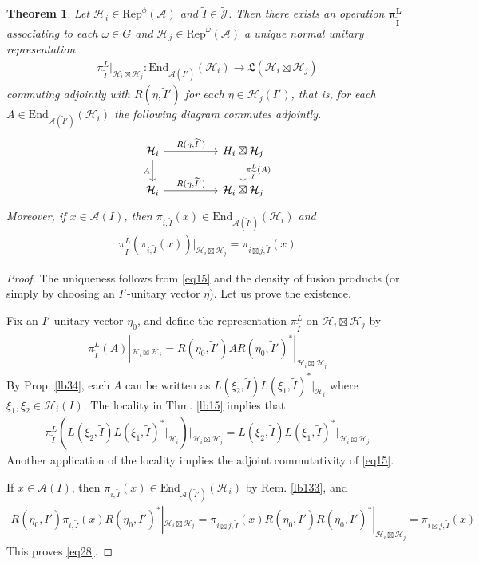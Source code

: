 \documentclass[11pt,b5paper,notitlepage]{article}
\theoremstyle{definition}
\theoremstyle{plain}
\newtheorem{thm}[df]{Theorem}
\newcommand{\fk}{\mathfrak}
\newcommand{\mc}{\mathcal}
\newcommand{\wtd}{\widetilde}
\newcommand{\End}{\mathrm{End}} %
\newcommand{\Rep}{\mathrm{Rep}}
\newcommand{\Jtd}{\widetilde{\mathcal J}}
\newcommand{\MA}{\mathcal A}
\newcommand{\MH}{\mathcal H}
\numberwithin{equation}{section}
\begin{document}
\begin{thm}\label{lb35}
Let $\MH_i\in\Rep^\phi(\MA)$ and $\wtd I\in\Jtd$. Then there exists an operation $\pmb{\pi^L_{\wtd I}}$ associating to each $\omega\in G$ and $\MH_j\in\Rep^\omega(\MA)$ a unique normal unitary representation
\begin{align}\label{eq41}
\pi^L_{\wtd I}|_{\MH_i\boxtimes\MH_j}:\End_{\MA(\wtd I')}(\MH_i)\rightarrow \fk L(\MH_i\boxtimes\MH_j)
\end{align}
commuting adjointly with $R(\eta,\wtd I')$ for each $\eta\in\MH_j(I')$, that is, for each $A\in \End_{\MA(\wtd I')}(\MH_i)$ the following diagram commutes adjointly.
\begin{equation}\label{eq15}
\begin{tikzcd}[column sep=huge]
\MH_i \arrow[r,"{R(\eta,\wtd I')}"] \arrow[d,"A"'] & \mc \MH_i\boxtimes\MH_j \arrow[d,"\pi^L_{\wtd I}(A)"] \\
\MH_i \arrow[r,"{R(\eta,\wtd I')}"]           & \MH_i\boxtimes\MH_j       
\end{tikzcd}
\end{equation}
Moreover, if $x\in\MA(I)$, then $\pi_{i,\wtd I}(x)\in\End_{\MA(\wtd I')}(\MH_i)$ and 
\begin{align}\label{eq28}
\pi^L_{\wtd I}(\pi_{i,\wtd I}(x))\big|_{\MH_i\boxtimes\MH_j}=\pi_{i\boxtimes j,\wtd I}(x)
\end{align}
\end{thm}


\begin{proof}
The uniqueness follows from \eqref{eq15} and the density of fusion products (or simply by choosing an $I'$-unitary vector $\eta$). Let us prove the existence.

Fix an $I'$-unitary vector $\eta_0$, and define the representation $\pi^L_{\wtd I}$ on $\MH_i\boxtimes\MH_j$ by
\begin{align*}
\pi^L_{\wtd I}(A)|_{\MH_i\boxtimes\MH_j}=R(\eta_0,\wtd I')AR(\eta_0,\wtd I')^*|_{\MH_i\boxtimes\MH_j}
\end{align*}
By Prop. \ref{lb34}, each $A$ can be written as $L(\xi_2,\wtd I)L(\xi_1,\wtd I)^*|_{\MH_i}$ where $\xi_1,\xi_2\in\MH_i(I)$. The locality in Thm. \ref{lb15} implies that
\begin{align}\label{eq17}
\pi^L_{\wtd I}(L(\xi_2,\wtd I)L(\xi_1,\wtd I)^*|_{\MH_i})\big|_{\MH_i\boxtimes\MH_j}=L(\xi_2,\wtd I)L(\xi_1,\wtd I)^*\big|_{\MH_i\boxtimes\MH_j}
\end{align}
Another application of the locality implies the adjoint commutativity of \eqref{eq15}.

If $x\in\MA(I)$, then $\pi_{i,\wtd I}(x)\in\End_{\MA(\wtd I')}(\MH_i)$ by Rem. \ref{lb133}, and 
\begin{align*}
R(\eta_0,\wtd I')\pi_{i,\wtd I}(x)R(\eta_0,\wtd I')^*|_{\MH_i\boxtimes\MH_j}=\pi_{i\boxtimes j,\wtd I}(x)R(\eta_0,\wtd I')R(\eta_0,\wtd I')^*|_{\MH_i\boxtimes\MH_j}=\pi_{i\boxtimes j,\wtd I}(x)
\end{align*}
This proves \eqref{eq28}.
\end{proof}
\end{document}
